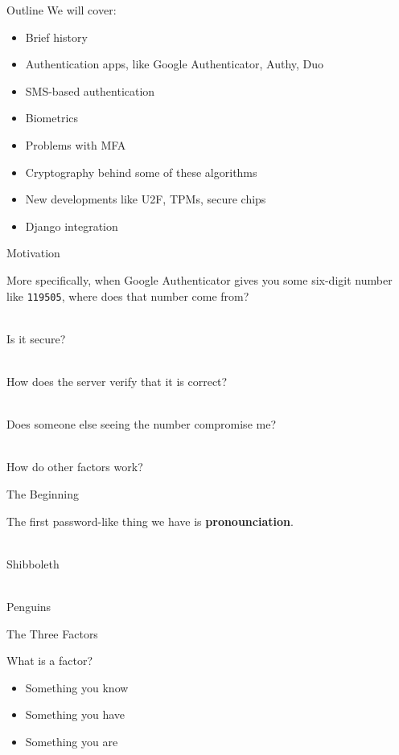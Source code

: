 \documentclass{beamer}
\begin{document}
\begin{frame}{Outline}
We will cover:

\begin{itemize}
  \item Brief history
  \item Authentication apps, like Google Authenticator, Authy, Duo
  \item SMS-based authentication
  \item Biometrics
  \item Problems with MFA
  \item Cryptography behind some of these algorithms
  \item New developments like U2F, TPMs, secure chips
  \item Django integration
\end{itemize}
\end{frame}

\begin{frame}{Motivation}

More specifically, when Google Authenticator gives you some six-digit number like \texttt{119505}, where does
that number come from?

\ \\

Is it secure?

\ \\

How does the server verify that it is correct?

\ \\

Does someone else seeing the number compromise me?

\ \\

How do other factors work?

\end{frame}

\begin{frame}{The Beginning}

The first password-like thing we have is \textbf{pronounciation}.

\ \\

Shibboleth

\ \\

Penguins

\end{frame}

\begin{frame}{The Three Factors}

What is a factor?

\begin{itemize}
  \item Something you know
  \item Something you have
  \item Something you are
\end{itemize}

\end{frame}
\end{document}
